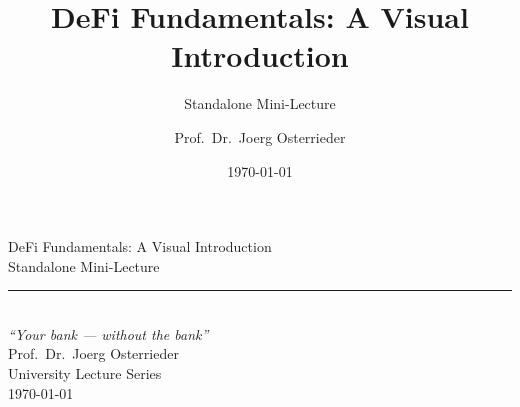 \documentclass[8pt,aspectratio=169]{beamer}
\title{DeFi Fundamentals: A Visual Introduction}
\subtitle{Standalone Mini-Lecture}
\author{Prof.~Dr.~Joerg Osterrieder}
\institute{University Lecture Series}
\date{\today}
\begin{document}
\begin{frame}[plain]
\vspace{2cm}
\begin{center}
{\Huge\color{mlpurple} DeFi Fundamentals: A Visual Introduction}\\[0.4cm]
{\Large\color{mlblue} Standalone Mini-Lecture}\\[0.3cm]
\textcolor{mlgray}{\rule{6cm}{0.4pt}}\\[0.3cm]
{\small\itshape ``Your bank --- without the bank''}\\[1.5cm]
{\normalsize Prof.~Dr.~Joerg Osterrieder}\\[0.2cm]
{\small University Lecture Series}\\[0.2cm]
{\small \today}
\end{center}
\end{frame}
\end{document}
